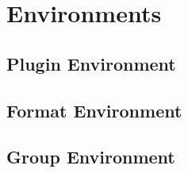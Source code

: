 \chapter{Environments}
\section{Plugin Environment}
\section{Format Environment}
\section{Group Environment}
